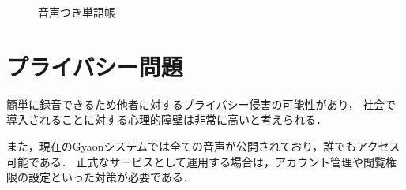 \begin{enumerate}
\begin{figure}[H]
\centering
{}
\caption{音声つき単語帳}
\label{word}
\end{figure}

\end{enumerate}

\section{プライバシー問題}
簡単に録音できるため他者に対するプライバシー侵害の可能性があり，
社会で導入されることに対する心理的障壁は非常に高いと考えられる\cite{Kawamura}．

また，現在のGyaonシステムでは全ての音声が公開されており，誰でもアクセス可能である．
正式なサービスとして運用する場合は，アカウント管理や閲覧権限の設定といった対策が必要である．